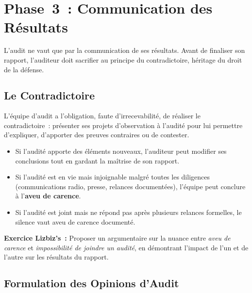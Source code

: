 \section{Phase~3~: Communication des Résultats}
\label{sec:communication}

L'audit ne vaut que par la communication de ses résultats. Avant de finaliser son
rapport, l'auditeur doit sacrifier au principe du contradictoire, héritage du droit
de la défense.

\subsection{Le Contradictoire}
\label{subsec:contradictoire}

L'équipe d'audit a l'obligation, faute d'irrecevabilité, de réaliser le
contradictoire~: présenter ses projets d'observation à l'audité pour lui permettre
d'expliquer, d'apporter des preuves contraires ou de contester.

\begin{itemize}
    \item Si l'audité apporte des éléments nouveaux, l'auditeur peut modifier ses
        conclusions tout en gardant la maîtrise de son rapport.
    \item Si l'audité est en vie mais injoignable malgré toutes les diligences
        (communications radio, presse, relances documentées), l'équipe peut conclure
        à l'\textbf{aveu de carence}.
    \item Si l'audité est joint mais ne répond pas après plusieurs relances formelles,
        le silence vaut aveu de carence documenté.
\end{itemize}

\begin{boxlizbiz}
\textbf{Exercice Lizbiz's~:}
Proposer un argumentaire sur la nuance entre \emph{aveu de carence} et
\emph{impossibilité de joindre un audité}, en démontrant l'impact de l'un et de
l'autre sur les résultats du rapport.
\end{boxlizbiz}

\subsection{Formulation des Opinions d'Audit}
\label{subsec:opinions}

